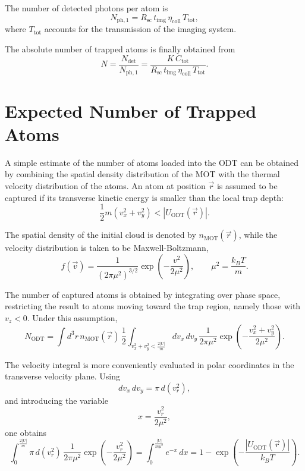 The number of detected photons per atom is
\begin{equation}
    N_{\mathrm{ph,1}} = R_{\mathrm{sc}}\,t_{\mathrm{img}}\,\eta_{\mathrm{coll}}\,T_{\mathrm{tot}},
\end{equation}
where $T_{\mathrm{tot}}$ accounts for the transmission of the imaging system.

The absolute number of trapped atoms is finally obtained from
\begin{equation}
    N = \frac{N_{\mathrm{det}}}{N_{\mathrm{ph,1}}}
    = \frac{K\,C_{\mathrm{tot}}}{R_{\mathrm{sc}}\,t_{\mathrm{img}}\,\eta_{\mathrm{coll}}\,T_{\mathrm{tot}}}.
\end{equation}

\section{Expected Number of Trapped Atoms}
\label{sec:exp_n_trapped}
A simple estimate of the number of atoms loaded into the ODT can be obtained by combining the spatial density distribution of the MOT with the thermal velocity distribution of the atoms. An atom at position $\vec{r}$ is assumed to be captured if its transverse kinetic energy is smaller than the local trap depth:
\begin{equation}
    \frac{1}{2}m\left(v_x^2 + v_y^2\right) < \left|U_{\mathrm{ODT}}(\vec{r})\right|.
\end{equation}

The spatial density of the initial cloud is denoted by $n_{\mathrm{MOT}}(\vec{r})$, while the velocity distribution is taken to be Maxwell-Boltzmann,
\begin{equation}
    f(\vec{v}) = \frac{1}{(2\pi\mu^2)^{3/2}} \exp\left(-\frac{v^2}{2\mu^2}\right),
    \qquad
    \mu^2 = \frac{k_B T}{m}.
\end{equation}

The number of captured atoms is obtained by integrating over phase space, restricting the result to atoms moving toward the trap region, namely those with $v_z < 0$. Under this assumption,
\begin{equation}
    N_{\mathrm{ODT}} =
    \int d^3r\, n_{\mathrm{MOT}}(\vec{r})\,
    \frac{1}{2}
    \int_{v_x^2+v_y^2<\frac{2|U|}{m}}
    dv_x\,dv_y\,
    \frac{1}{2\pi\mu^2}
    \exp\left(-\frac{v_x^2+v_y^2}{2\mu^2}\right).
\end{equation}

The velocity integral is more conveniently evaluated in polar coordinates in the transverse velocity plane. Using
\begin{equation}
    dv_x\,dv_y = \pi\,d(v_r^2),
\end{equation}
and introducing the variable
\begin{equation}
    x = \frac{v_r^2}{2\mu^2},
\end{equation}
one obtains
\begin{equation}
    \int_{0}^{\frac{2|U|}{m}}
    \pi\,d(v_r^2)\,
    \frac{1}{2\pi\mu^2}
    \exp\left(-\frac{v_r^2}{2\mu^2}\right)
    =
    \int_{0}^{\frac{|U|}{m\mu^2}} e^{-x}\,dx
    =
    1 - \exp\left(-\frac{|U_{\mathrm{ODT}}(\vec{r})|}{k_B T}\right).
\end{equation}

